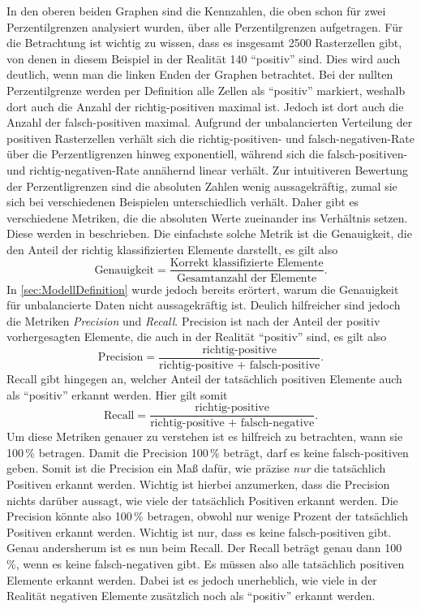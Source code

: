 In den oberen beiden Graphen sind die Kennzahlen, die oben schon für zwei Perzentilgrenzen analysiert wurden, über alle Perzentilgrenzen aufgetragen.
Für die Betrachtung ist wichtig zu wissen, dass es insgesamt 2500 Rasterzellen gibt, von denen in diesem Beispiel in der Realität 140 "`positiv"' sind.
Dies wird auch deutlich, wenn man die linken Enden der Graphen betrachtet.
Bei der nullten Perzentilgrenze werden per Definition alle Zellen als "`positiv"' markiert, weshalb dort auch die Anzahl der richtig-positiven maximal ist.
Jedoch ist dort auch die Anzahl der falsch-positiven maximal.
Aufgrund der unbalancierten Verteilung der positiven Rasterzellen verhält sich die richtig-positiven- und falsch-negativen-Rate über die Perzentligrenzen hinweg exponentiell, während sich die falsch-positiven- und richtig-negativen-Rate annähernd linear verhält.
Zur intuitiveren Bewertung der Perzentligrenzen sind die absoluten Zahlen wenig aussagekräftig, zumal sie sich bei verschiedenen Beispielen unterschiedlich verhält.
Daher gibt es verschiedene Metriken, die die absoluten Werte zueinander ins Verhältnis setzen.
Diese werden in \cite{ImbalancedData} beschrieben.
Die einfachste solche Metrik ist die Genauigkeit, die den Anteil der richtig klassifizierten Elemente darstellt, es gilt also
$$
\text{Genauigkeit} = \frac{\text{Korrekt klassifizierte Elemente}}{\text{Gesamtanzahl der Elemente}}.
$$
In \autoref{sec:ModellDefinition} wurde jedoch bereits erörtert, warum die Genauigkeit für unbalancierte Daten nicht aussagekräftig ist.
Deulich hilfreicher sind jedoch die Metriken \emph{Precision} und \emph{Recall}.
Precision ist nach \cite{ImbalancedData} der Anteil der positiv vorhergesagten Elemente, die auch in der Realität "`positiv"' sind, es gilt also
$$
\text{Precision} = \frac{\text{richtig-positive}}{\text{richtig-positive + falsch-positive}}.
$$
Recall gibt hingegen an, welcher Anteil der tatsächlich positiven Elemente auch als "`positiv"' erkannt werden.
Hier gilt somit
$$
\text{Recall} = \frac{\text{richtig-positive}}{\text{richtig-positive + falsch-negative}}.
$$
Um diese Metriken genauer zu verstehen ist es hilfreich zu betrachten, wann sie 100\,\% betragen.
Damit die Precision 100\,\% beträgt, darf es keine falsch-positiven geben.
Somit ist die Precision ein Maß dafür, wie präzise \emph{nur} die tatsächlich Positiven erkannt werden.
Wichtig ist hierbei anzumerken, dass die Precision nichts darüber aussagt, wie viele der tatsächlich Positiven erkannt werden.
Die Precision könnte also 100\,\% betragen, obwohl nur wenige Prozent der tatsächlich Positiven erkannt werden.
Wichtig ist nur, dass es keine falsch-positiven gibt.
Genau andersherum ist es nun beim Recall.
Der Recall beträgt genau dann 100\,\%, wenn es keine falsch-negativen gibt.
Es müssen also alle tatsächlich positiven Elemente erkannt werden.
Dabei ist es jedoch unerheblich, wie viele in der Realität negativen Elemente zusätzlich noch als "`positiv"' erkannt werden.

